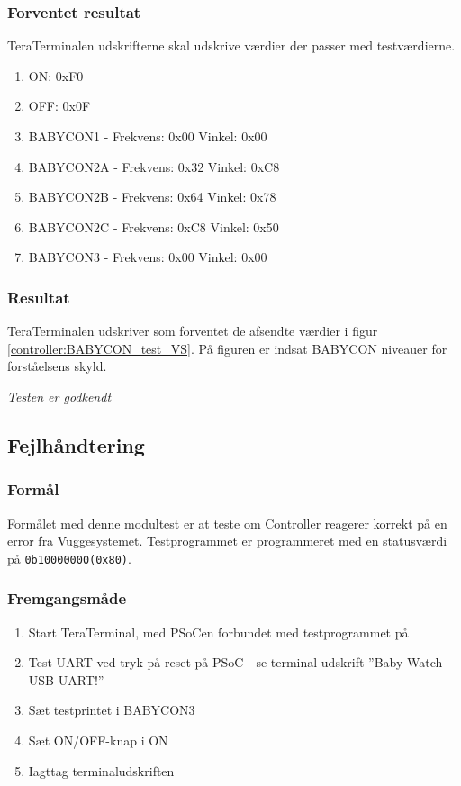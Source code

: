 \subsubsection*{Forventet resultat} 
TeraTerminalen udskrifterne skal udskrive værdier der passer med testværdierne.
\begin{enumerate}
\item ON:  0xF0
\item OFF: 0x0F
\item BABYCON1 -  Frekvens: 0x00 Vinkel: 0x00
\item BABYCON2A - Frekvens: 0x32 Vinkel: 0xC8
\item BABYCON2B - Frekvens: 0x64 Vinkel: 0x78
\item BABYCON2C - Frekvens: 0xC8 Vinkel: 0x50
\item BABYCON3 -  Frekvens: 0x00 Vinkel: 0x00
\end{enumerate}

\subsubsection*{Resultat} 
TeraTerminalen udskriver som forventet de afsendte værdier i figur \ref{controller:BABYCON_test_VS}. På figuren er indsat BABYCON niveauer for forståelsens skyld.


\textit{Testen er godkendt}

\subsection*{Fejlhåndtering}

\subsubsection*{Formål}
Formålet med denne modultest er at teste om Controller reagerer korrekt på en error fra Vuggesystemet. Testprogrammet er programmeret med en statusværdi på \verb+0b10000000(0x80)+. 

\subsubsection*{Fremgangsmåde}
\begin{enumerate}
\item Start TeraTerminal, med PSoCen forbundet med testprogrammet på
\item Test UART ved tryk på reset på PSoC - se terminal udskrift ''Baby Watch - USB UART!''
\item Sæt testprintet i BABYCON3
\item Sæt ON/OFF-knap i ON
\item Iagttag terminaludskriften
\end{enumerate}

